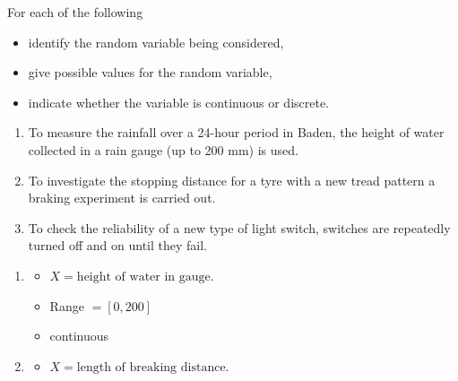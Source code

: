 \documentclass[twoside,11pt,a4paper]{article}
\newif\ifEN \ENtrue	                %
\def\tr|#1|#2|{\ifEN #2\else #1\fi}     %
\def\vsp{\vspace{5mm}}
\theoremstyle{definition}
\newcounter{exc}
\begin{document}
\vsp


\newpage
\begin{xxwrap}
\begin{exc}
\tr|in jedem der folgenden Beispiele |For each of the following|
\begin{itemize}
\item \tr|identifizieren Sie die Zufallsvariable, |identify the random variable being considered,|
\item \tr|geben Sie mögliche Werte der Zufallsvariabeln an, |give possible values for the random variable,|
\item \tr|geben Sie an, ob die Zufallsvariabel stetig oder diskret ist. |indicate whether the variable is continuous or discrete.|
\end{itemize}
\begin{enumerate}
\item \tr|Um die Regenmenge während 24 Stunden in Baden zu messen, wird die Wasserhöhe in einem Auffangbehälter (mit Höhe 200mm) verwendet. 
         |To measure the rainfall over a 24-hour period in Baden, the height of water collected in a rain gauge (up to 200 mm) is used.|
\item \tr|Um den Bremsweg eines Reifentyps zu untersuchen wird ein Bremsexperiment durchgeführt. 
         |To investigate the stopping distance for a tyre with a new tread pattern a braking experiment is carried out. |
\item \tr|Um die Zuverlässigkeit eines Lichtschalters zu testen, wird es so lange an und ausgeschalter, bis er nicht mehr funktioniert. 
         |To check the reliability of a new type of light switch, switches are repeatedly turned off and on until they fail.|
\end{enumerate}
\end{exc}
\begin{Answer}
  \begin{enumerate}
  \item 
    \begin{itemize}
    \item $X=\text{\tr|Wasserhöhe im Behälter|height of water in gauge|}$.
    \item \tr|Werte|Range| $=[0,200]$ 
    \item \tr|stetig|continuous|
    \end{itemize}
  \item 
    \begin{itemize}
    \item $X=\text{\tr|Länge des Bremsweges|length of breaking distance|}$.

\end{itemize}
\end{enumerate}
\end{Answer}
\end{xxwrap}
\end{document}
